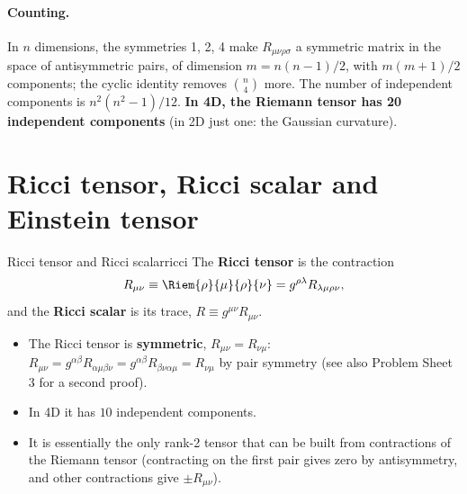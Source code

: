 \paragraph{Counting.} In $n$ dimensions, the symmetries 1, 2, 4 make $R_{\mu\nu\rho\sigma}$ a symmetric matrix in the space of antisymmetric pairs, of dimension $m=n(n-1)/2$, with $m(m+1)/2$ components; the cyclic identity removes $\binom n4$ more. The number of independent components is $n^2(n^2-1)/12$. \textbf{In 4D, the Riemann tensor has 20 independent components} (in 2D just one: the Gaussian curvature).

\section{Ricci tensor, Ricci scalar and Einstein tensor}

\begin{definition}{Ricci tensor and Ricci scalar}{ricci}
The \textbf{Ricci tensor} is the contraction
\begin{equation}
  R_{\mu\nu}\equiv\Riem{\rho}{\mu}{\rho}{\nu}=g^{\rho\lambda}R_{\lambda\mu\rho\nu},
\end{equation}
and the \textbf{Ricci scalar} is its trace, $R\equiv g^{\mu\nu}R_{\mu\nu}$.
\end{definition}
\begin{itemize}[nosep]
  \item The Ricci tensor is \textbf{symmetric}, $R_{\mu\nu}=R_{\nu\mu}$: $R_{\mu\nu}=g^{\alpha\beta}R_{\alpha\mu\beta\nu}=g^{\alpha\beta}R_{\beta\nu\alpha\mu}=R_{\nu\mu}$ by pair symmetry (see also Problem Sheet 3 for a second proof).
  \item In 4D it has $10$ independent components.
  \item It is essentially the only rank-2 tensor that can be built from contractions of the Riemann tensor (contracting on the first pair gives zero by antisymmetry, and other contractions give $\pm R_{\mu\nu}$).
\end{itemize}

